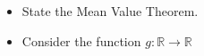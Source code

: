 \documentclass{article}
\begin{document}
\begin{exercise}
  \begin{itemize}
    \item State the Mean Value Theorem.
    \item Consider the function $g:\mathbb{R} \rightarrow \mathbb{R}$
  \end{itemize}
\end{exercise}
\end{document}
